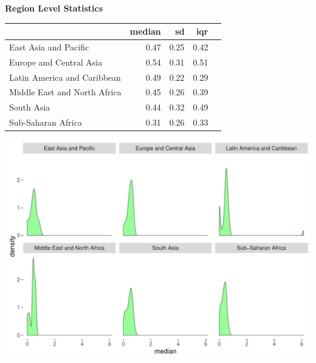 \documentclass{article}\usepackage[]{graphicx}\usepackage[]{color}
\makeatletter
\def\maxwidth{ %
  \ifdim\Gin@nat@width>\linewidth
    \linewidth
  \else
    \Gin@nat@width
  \fi
}
\makeatother
\begin{document}
\newpage

  \raggedright{\color{white!30!black} \textbf{\Large Region Level Statistics}}
    \begin{minipage}[c]{0.99\textwidth}  
      \vspace*{0.4cm}
      
\begin{tabular}{lrrrl}
  & median & sd & iqr &  \\ 
  \hline
East Asia and Pacific & 0.47 & 0.25 & 0.42 &  \\ 
  Europe and Central Asia & 0.54 & 0.31 & 0.51 &  \\ 
  Latin America and Caribbean & 0.49 & 0.22 & 0.29 &  \\ 
  Middle East and North Africa & 0.45 & 0.26 & 0.39 &  \\ 
  South Asia & 0.44 & 0.32 & 0.49 &  \\ 
  Sub-Saharan Africa & 0.31 & 0.26 & 0.33 &  \\ 
  \end{tabular}

      \vspace*{1cm}
    \end{minipage}
    
    \begin{minipage}[c]{0.99\textwidth}  
    


{\centering \includegraphics[width=\maxwidth]{figure/plot4-1} 

}



      \vspace*{0.5cm}
    \end{minipage}

\end{document}

